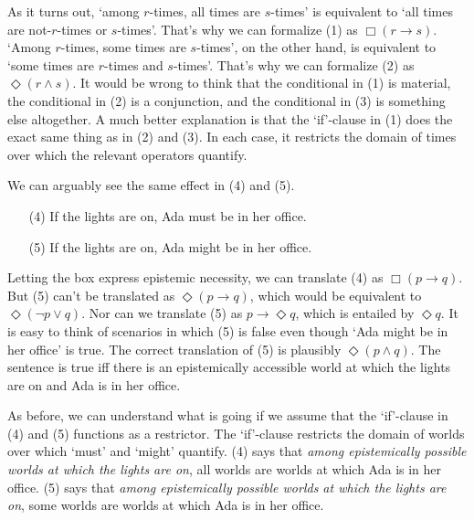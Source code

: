 As it turns out, `among $r$-times, all times are $s$-times' is equivalent to `all
times are not-$r$-times or $s$-times'. That's why we can formalize (1) as
$\Box(r \to s)$. `Among $r$-times, some times are $s$-times', on the other hand,
is equivalent to `some times are $r$-times and $s$-times'. That's why we can
formalize (2) as $\Diamond(r \land s)$. It would be wrong to think that the
conditional in (1) is material, the conditional in (2) is a conjunction, and the
conditional in (3) is something else altogether. A much better explanation is
that the `if'-clause in (1) does the exact same thing as in (2) and (3). In each
case, it restricts the domain of times over which the relevant operators
quantify.

We can arguably see the same effect in (4) and (5).
\begin{enumerate}[leftmargin=10mm]
  \itemsep-1mm  
  \item[(4)] If the lights are on, Ada must be in her office.
  \item[(5)] If the lights are on, Ada might be in her office.
\end{enumerate}
Letting the box express epistemic necessity, we can translate (4) as
$\Box(p \to q)$. But (5) can't be translated as $\Diamond(p \to q)$, which would
be equivalent to $\Diamond(\neg p \lor q)$. Nor can we translate (5) as
$p \to \Diamond q$, which is entailed by $\Diamond q$. It is easy to think of
scenarios in which (5) is false even though `Ada might be in her office' is
true. The correct translation of (5) is plausibly $\Diamond(p \land q)$. The
sentence is true iff there is an epistemically accessible world at which the
lights are on and Ada is in her office.

As before, we can understand what is going if we assume that the `if'-clause in
(4) and (5) functions as a restrictor. The `if'-clause restricts the domain of
worlds over which `must' and `might' quantify. (4) says that \emph{among
  epistemically possible worlds at which the lights are on}, all worlds are
worlds at which Ada is in her office. (5) says that \emph{among epistemically
  possible worlds at which the lights are on}, some worlds are worlds at which
Ada is in her office.

